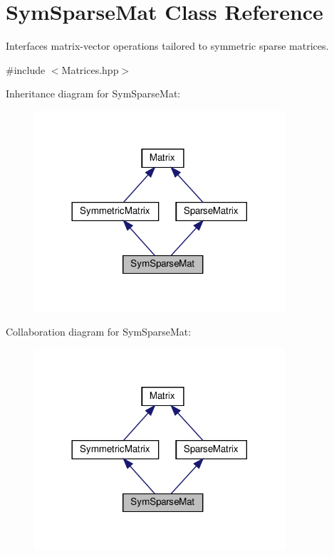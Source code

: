 \hypertarget{class_sym_sparse_mat}{}\section{Sym\+Sparse\+Mat Class Reference}
\label{class_sym_sparse_mat}


Interfaces matrix-\/vector operations tailored to symmetric sparse matrices.  




{\ttfamily \#include $<$Matrices.\+hpp$>$}



Inheritance diagram for Sym\+Sparse\+Mat\+:
\nopagebreak
\begin{figure}[H]
\begin{center}
\leavevmode
\includegraphics[width=264pt]{class_sym_sparse_mat__inherit__graph}
\end{center}
\end{figure}


Collaboration diagram for Sym\+Sparse\+Mat\+:
\nopagebreak
\begin{figure}[H]
\begin{center}
\leavevmode
\includegraphics[width=264pt]{class_sym_sparse_mat__coll__graph}
\end{center}
\end{figure}
